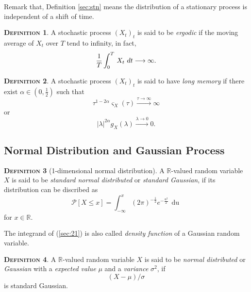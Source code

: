 \documentclass[a4paper, twoside, 11pt]{article}
\theoremstyle{definition}
\newtheorem{definition}{\scshape Definition}[section]
\newcommand{\sqbr}[1]{\left[ {#1} \right]}
\begin{document}
Remark that, Definition \ref{sec:stn} means the distribution of a stationary process is independent of a shift of time.

\begin{definition}
  A stochastic process $(X_t)_t$ is said to be \emph{ergodic} if the moving average of $X_t$ over $T$ tend to infinity, in fact,
  \begin{equation}
	\frac{1}{T}\int_0^T\,X_t\,\mathop{dt} \longrightarrow \infty\nonumber\\.
  \end{equation}
	\label{sec:erg}
\end{definition}

\begin{definition}
  A stochastic process $(X_t)_t$ is said to have \emph{long memory} if there exist  $\alpha \in (0, \frac{1}{2})$ such that
  \begin{equation}
	\tau ^{1 - 2\alpha} \varsigma_X(\tau) \overset{\tau\rightarrow \infty}{\longrightarrow} \infty
	\label{sec:lm1}
  \end{equation}
   or 
  \begin{equation}
	|\lambda|^{2\alpha}g_X(\lambda) \overset{\lambda\rightarrow 0}{\longrightarrow} 0 .
	\label{sec:lm2}
  \end{equation}
 
\end{definition}

\subsection{Normal Distribution and  Gaussian Process}
\begin{definition}[1-dimensional normal distribution]
  A $\mathbb{R}$-valued random variable $X$ is said to be \emph{standard normal distributed} or \emph{standard Gaussian}, if its distribution can be discribed as
  \begin{equation}
	\mathcal{P}\sqbr{X \le x} = \int_{-\infty}^{x} (2\pi)^{-\frac{1}{2}}e^{-\frac{u^2}{2}}\,\mathop{du}  
	\label{sec:21}
  \end{equation}
  for $x \in \mathbb{R}$.
\end{definition}
The integrand of (\ref{sec:21}) is also called \emph{density function} of a Gaussian random variable.

\begin{definition}
  A $\mathbb{R}$-valued random variable $X$ is said to be \emph{normal distributed} or \emph{Gaussian} with a \emph{expected value} $\mu$ and a \emph{variance} $\sigma^2$, if
\[
  (X-\mu) / \sigma
\]
is standard Gaussian.
\end{definition}
\end{document}
